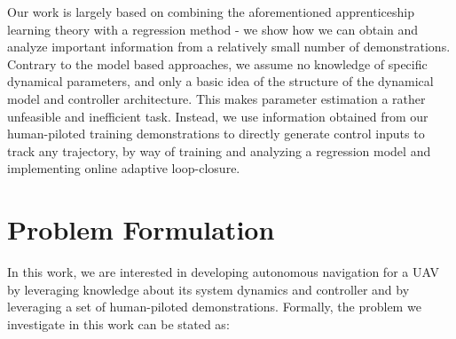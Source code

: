 \documentclass[letterpaper, 10 pt, conference]{ieeeconf}  %
\newcommand\NB[1]{$\spadesuit$\footnote{NB: #1}}
\begin{document}
Our work is largely based on combining the aforementioned apprenticeship learning theory with a regression method - we show how we can obtain and analyze important information from a relatively small number of demonstrations. Contrary to the model based approaches, we assume no knowledge of specific dynamical parameters, and only a basic idea of the structure of the dynamical model and controller architecture. This makes parameter estimation a rather unfeasible and inefficient task. Instead, we use information obtained from our human-piloted training demonstrations to directly generate control inputs to track any trajectory, by way of training and analyzing a regression model and implementing online adaptive loop-closure.



\section{Problem Formulation}
In this work, we are interested in developing autonomous navigation for a UAV by leveraging knowledge about its system dynamics and controller and by leveraging a set of human-piloted demonstrations.
Formally, the problem we investigate in this work can be stated as:
\end{document}

